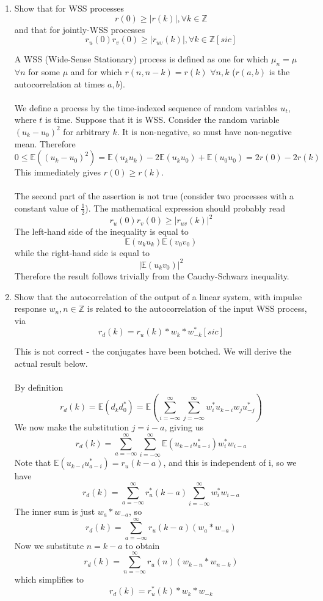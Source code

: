 \documentclass{article}
\newcommand{\chapternumber}{2}
\newenvironment{QandA}{\begin{enumerate}[label=\chapternumber.\arabic*]\bfseries\boldmath}
	{\end{enumerate}}
\newenvironment{answered}{\par\bigskip\normalfont\unboldmath}{}
\begin{document}
\begin{QandA}
	\item Show that for WSS processes
	\[r(0)\geq |r(k)|,\forall k\in \mathbb{Z}\]
	and that for jointly-WSS processes
	\[r_u(0)r_v(0)\geq|r_{uv}(k)|,\forall k\in \mathbb{Z}[sic]\]
	\begin{answered}
		A WSS (Wide-Sense Stationary) process is defined as one for which $\mu_n=\mu$ $\forall n$ for some $\mu$ and for which $r(n,n-k)=r(k)$ $\forall n,k$ ($r(a,b)$ is the autocorrelation at times $a,b$).\\
		\\
		We define a process by the time-indexed sequence of random variables $u_t$, where $t$ is time. Suppose that it is WSS. Consider the random variable $(u_k-u_0)^2$ for arbitrary $k$. It is non-negative, so must have non-negative mean. Therefore
		\[0\leq \mathbb{E}((u_k-u_0)^2)=\mathbb{E}(u_ku_k)-2\mathbb{E}(u_ku_0)+\mathbb{E}(u_0u_0)=2r(0)-2r(k)\]
		This immediately gives $r(0)\geq r(k)$.\\
		\\
		The second part of the assertion is not true (consider two processes with a constant value of $\frac{1}{2}$). The mathematical expression should probably read
		\[r_u(0)r_v(0)\geq|r_{uv}(k)|^2\]
		The left-hand side of the inequality is equal to
		\[\mathbb{E}(u_ku_k)\mathbb{E}(v_0v_0)\]
		while the right-hand side is equal to
		\[|\mathbb{E}(u_kv_0)|^2\]
		Therefore the result follows trivially from the Cauchy-Schwarz inequality.
		
	\end{answered}

	\item Show that the autocorrelation of the output of a linear system, with impulse response $w_n,n\in\mathbb{Z}$ is related to the autocorrelation of the input WSS process, via
	\[r_d(k)=r_u(k)* w_k* w^*_{-k}[sic]\]
	\begin{answered}
		This is not correct - the conjugates have been botched. We will derive the actual result below.\\
		\\
		By definition
		\[r_d(k)=\mathbb{E}(d_kd_0^*)=\mathbb{E}\left(\sum_{i=-\infty}^{\infty}\sum_{j=-\infty}^{\infty}w_i^*u_{k-i}w_ju_{-j}^*\right)\]
		We now make the substitution $j=i-a$, giving us
		\[r_d(k)=\sum_{a=-\infty}^{\infty}\sum_{i=-\infty}^{\infty}\mathbb{E}(u_{k-i}u_{a-i}^*)w_i^*w_{i-a}\]
		Note that $\mathbb{E}(u_{k-i}u_{a-i}^*)=r_u(k-a)$, and this is independent of i, so we have
		\[r_d(k)=\sum_{a=-\infty}^{\infty}r_u^*(k-a)\sum_{i=-\infty}^{\infty}w_i^*w_{i-a}\]
		The inner sum is just $w_a*w_{-a}$, so
		\[r_d(k)=\sum_{a=-\infty}^{\infty}r_u(k-a)(w_a*w_{-a})\]
		Now we substitute $n=k-a$ to obtain
		\[r_d(k)=\sum_{n=-\infty}^{\infty}r_u(n)(w_{k-n}*w_{n-k})\]
		which simplifies to
		\[r_d(k)=r_u^*(k)*w_k*w_{-k}\]
	\end{answered}


\end{QandA}
\end{document}
